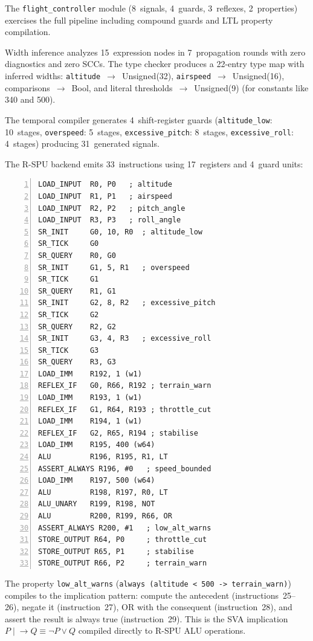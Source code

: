 \documentclass[conference]{IEEEtran}
\begin{document}
The \texttt{flight\_controller} module (8~signals, 4~guards, 3~reflexes,
2~properties) exercises the full pipeline including compound guards
and LTL property compilation.

Width inference analyzes 15~expression nodes in 7~propagation rounds
with zero diagnostics and zero SCCs.  The type checker produces a
22-entry type map with inferred widths: \texttt{altitude}~$\to$~Unsigned(32),
\texttt{airspeed}~$\to$~Unsigned(16), comparisons~$\to$~Bool,
and literal thresholds~$\to$~Unsigned(9) (for constants like 340 and 500).

The temporal compiler generates 4~shift-register guards
(\texttt{altitude\_low}: 10~stages, \texttt{overspeed}: 5~stages,
\texttt{excessive\_pitch}: 8~stages, \texttt{excessive\_roll}: 4~stages)
producing 31~generated signals.

The R-SPU backend emits 33~instructions using 17~registers and
4~guard units:

\begin{lstlisting}[language=RSPU,numbers=left,float=t,
  caption={R-SPU assembly for the flight controller (excerpt).},
  label={lst:rspu-flight}]
LOAD_INPUT  R0, P0   ; altitude
LOAD_INPUT  R1, P1   ; airspeed
LOAD_INPUT  R2, P2   ; pitch_angle
LOAD_INPUT  R3, P3   ; roll_angle
SR_INIT     G0, 10, R0  ; altitude_low
SR_TICK     G0
SR_QUERY    R0, G0
SR_INIT     G1, 5, R1   ; overspeed
SR_TICK     G1
SR_QUERY    R1, G1
SR_INIT     G2, 8, R2   ; excessive_pitch
SR_TICK     G2
SR_QUERY    R2, G2
SR_INIT     G3, 4, R3   ; excessive_roll
SR_TICK     G3
SR_QUERY    R3, G3
LOAD_IMM    R192, 1 (w1)
REFLEX_IF   G0, R66, R192 ; terrain_warn
LOAD_IMM    R193, 1 (w1)
REFLEX_IF   G1, R64, R193 ; throttle_cut
LOAD_IMM    R194, 1 (w1)
REFLEX_IF   G2, R65, R194 ; stabilise
LOAD_IMM    R195, 400 (w64)
ALU         R196, R195, R1, LT
ASSERT_ALWAYS R196, #0   ; speed_bounded
LOAD_IMM    R197, 500 (w64)
ALU         R198, R197, R0, LT
ALU_UNARY   R199, R198, NOT
ALU         R200, R199, R66, OR
ASSERT_ALWAYS R200, #1   ; low_alt_warns
STORE_OUTPUT R64, P0     ; throttle_cut
STORE_OUTPUT R65, P1     ; stabilise
STORE_OUTPUT R66, P2     ; terrain_warn
\end{lstlisting}

The property \texttt{low\_alt\_warns} (\texttt{always (altitude < 500
-> terrain\_warn)}) compiles to the implication pattern:
compute the antecedent (instructions~25--26), negate it (instruction~27),
OR with the consequent (instruction~28), and assert the result is always
true (instruction~29).  This is the SVA implication $P \mid\!\!\to Q
\equiv \lnot P \lor Q$ compiled directly to R-SPU ALU operations.
\end{document}
